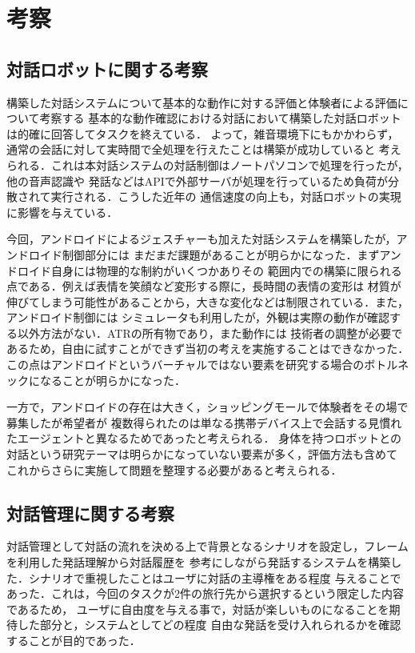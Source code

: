 \section{考察}
\label{考察}
\subsection{対話ロボットに関する考察}
構築した対話システムについて基本的な動作に対する評価と体験者による評価について考察する
基本的な動作確認における対話において構築した対話ロボットは的確に回答してタスクを終えている．
よって，雑音環境下にもかかわらず，通常の会話に対して実時間で全処理を行えたことは構築が成功していると
考えられる．これは本対話システムの対話制御はノートパソコンで処理を行ったが，他の音声認識や
発話などはAPIで外部サーバが処理を行っているため負荷が分散されて実行される．こうした近年の
通信速度の向上も，対話ロボットの実現に影響を与えている．

今回，アンドロイドによるジェスチャーも加えた対話システムを構築したが，アンドロイド制御部分には
まだまだ課題があることが明らかになった．まずアンドロイド自身には物理的な制約がいくつかありその
範囲内での構築に限られる点である．例えば表情を笑顔など変形する際に，長時間の表情の変形は
材質が伸びてしまう可能性があることから，大きな変化などは制限されている．また，アンドロイド制御には
シミュレータも利用したが，外観は実際の動作が確認する以外方法がない．ATRの所有物であり，また動作には
技術者の調整が必要であるため，自由に試すことができず当初の考えを実施することはできなかった．
この点はアンドロイドというバーチャルではない要素を研究する場合のボトルネックになることが明らかになった．

一方で，アンドロイドの存在は大きく，ショッピングモールで体験者をその場で募集したが希望者が
複数得られたのは単なる携帯デバイス上で会話する見慣れたエージェントと異なるためであったと考えられる．
身体を持つロボットとの対話という研究テーマは明らかになっていない要素が多く，評価方法も含めて
これからさらに実施して問題を整理する必要があると考えられる．

\subsection{対話管理に関する考察}
対話管理として対話の流れを決める上で背景となるシナリオを設定し，フレームを利用した発話理解から対話履歴を
参考にしながら発話するシステムを構築した．シナリオで重視したことはユーザに対話の主導権をある程度
与えることであった．これは，今回のタスクが2件の旅行先から選択するという限定した内容であるため，
ユーザに自由度を与える事で，対話が楽しいものになることを期待した部分と，システムとしてどの程度
自由な発話を受け入れられるかを確認することが目的であった．

